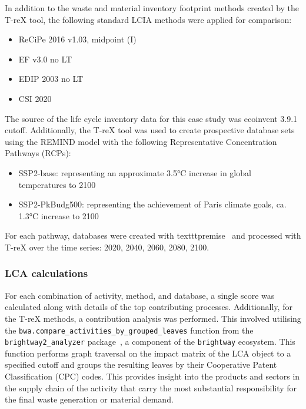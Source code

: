 In addition to the waste and material inventory footprint methods created by the T-reX tool, the following standard LCIA methods were applied for comparison:

\begin{itemize}[itemsep=0pt]
    \item ReCiPe 2016 v1.03, midpoint (I)
    \item EF v3.0 no LT
    \item EDIP 2003 no LT
    \item CSI 2020
\end{itemize}

The source of the life cycle inventory data for this case study was ecoinvent 3.9.1 cutoff. Additionally, the T-reX tool was used to create prospective database sets using the \mbox{REMIND} model with the following Representative Concentration Pathways (RCPs):
\begin{itemize}
    \item SSP2-base: representing an approximate 3.5°C increase in global temperatures to 2100
    \item SSP2-PkBudg500: representing the achievement of Paris climate goals, ca. 1.3°C increase to 2100
\end{itemize}

For each pathway, databases were created with texttt{premise}~\citep{sacchi2022premise} and processed with T-reX over the time series: 2020, 2040, 2060, 2080, 2100.

\subsubsection{LCA calculations}
For each combination of activity, method, and database, a single score was calculated along with details of the top contributing processes. Additionally, for the T-reX methods, a contribution analysis was performed. This involved utilising the \texttt{bwa.compare\_activities\_by\_grouped\_leaves} function from the \texttt{brightway2\_analyzer} package~\citep{mutel2016brightway2analyzer}, a component of the \texttt{brightway} ecosystem. This function performs graph traversal on the impact matrix of the LCA object to a specified cutoff and groups the resulting leaves by their Cooperative Patent Classification (CPC) codes. This provides insight into the products and sectors in the supply chain of the activity that carry the most substantial responsibility for the final waste generation or material demand.


